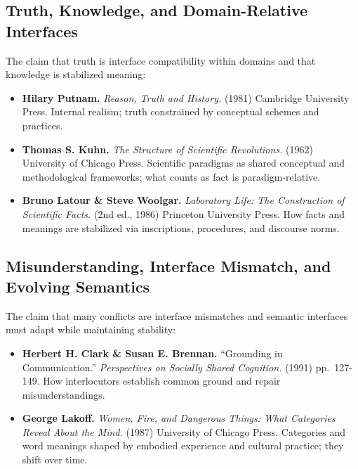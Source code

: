 \documentclass[
  openright]{book}
\begin{document}
\subsection{Truth, Knowledge, and Domain-Relative
Interfaces}\label{truth-knowledge-and-domain-relative-interfaces}

The claim that truth is interface compatibility within domains and that
knowledge is stabilized meaning:

\begin{itemize}
\item
  \textbf{Hilary Putnam.} \emph{Reason, Truth and History.} (1981)
  Cambridge University Press. Internal realism; truth constrained by
  conceptual schemes and practices.
\item
  \textbf{Thomas S. Kuhn.} \emph{The Structure of Scientific
  Revolutions.} (1962) University of Chicago Press. Scientific paradigms
  as shared conceptual and methodological frameworks; what counts as
  fact is paradigm-relative.
\item
  \textbf{Bruno Latour \& Steve Woolgar.} \emph{Laboratory Life: The
  Construction of Scientific Facts.} (2nd ed., 1986) Princeton
  University Press. How facts and meanings are stabilized via
  inscriptions, procedures, and discourse norms.
\end{itemize}

\subsection{Misunderstanding, Interface Mismatch, and Evolving
Semantics}\label{misunderstanding-interface-mismatch-and-evolving-semantics}

The claim that many conflicts are interface mismatches and semantic
interfaces must adapt while maintaining stability:

\begin{itemize}
\item
  \textbf{Herbert H. Clark \& Susan E. Brennan.} ``Grounding in
  Communication.'' \emph{Perspectives on Socially Shared Cognition.}
  (1991) pp.~127-149. How interlocutors establish common ground and
  repair misunderstandings.
\item
  \textbf{George Lakoff.} \emph{Women, Fire, and Dangerous Things: What
  Categories Reveal About the Mind.} (1987) University of Chicago Press.
  Categories and word meanings shaped by embodied experience and
  cultural practice; they shift over time.
\end{itemize}
\end{document}
